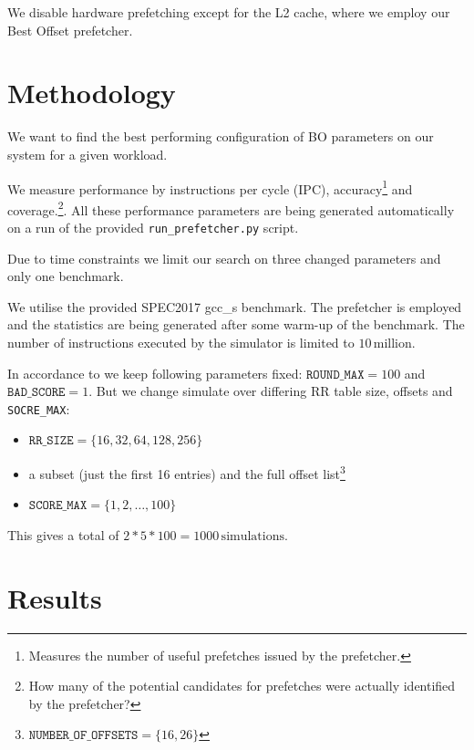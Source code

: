 \documentclass[conference]{IEEEtran}
\begin{document}
We disable hardware prefetching except for the L2 cache, where we employ our Best Offset prefetcher.

\section{Methodology}

We want to find the best performing configuration of BO parameters on our system for a given workload.

We measure performance by instructions per cycle (IPC), accuracy\footnote{Measures the number of useful prefetches issued by the prefetcher.} and
coverage.\footnote{How many of the potential candidates for prefetches were actually identified by the prefetcher?}.
All these performance parameters are being generated automatically on a run of the provided \texttt{run\_prefetcher.py} script.

Due to time constraints we limit our search on three changed parameters and only one benchmark.

We utilise the provided SPEC2017 gcc\_s benchmark\cite{spec2017gccs}.
The prefetcher is employed and the statistics are being generated after some warm-up of the benchmark.
The number of instructions executed by the simulator is limited to $10\,\text{million}$.

In accordance to \cite[table 2]{BOP_2016} we keep following parameters fixed: $\texttt{ROUND\_MAX} = 100$ and $\texttt{BAD\_SCORE} = 1$.
But we change simulate over differing RR table size, offsets and \texttt{SOCRE\_MAX}:
\begin{itemize}
    \item $\texttt{RR\_SIZE} = \{16, 32, 64, 128, 256\}$
    \item a subset (just the first 16 entries) and the full offset list\footnote{$\texttt{NUMBER\_OF\_OFFSETS} = \{16, 26\}$}
    \item $\texttt{SCORE\_MAX} = \{1,2,\dots,100\}$
\end{itemize}
This gives a total of $2 * 5 * 100 = 1000\,\text{simulations}$.




\section{Results}
\end{document}
